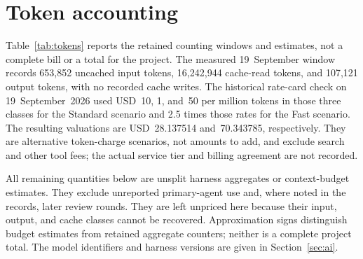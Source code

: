 \documentclass[11pt]{amsart}
\theoremstyle{plain}
\theoremstyle{definition}
\theoremstyle{remark}
\numberwithin{equation}{section}
\begin{document}
\appendix
\section{Token accounting}\label{app:tokens}

Table~\ref{tab:tokens} reports the retained counting windows and
estimates, not a complete bill or a total for the project. The measured
19~September window records 653,852 uncached input tokens, 16,242,944
cache-read tokens, and 107,121 output tokens, with no recorded cache
writes. The historical rate-card check on 19~September~2026 used
USD~10, 1, and~50 per million tokens in those three classes for the
Standard scenario and 2.5 times those rates for the Fast scenario.
The resulting valuations are USD~28.137514 and~70.343785, respectively.
They are alternative token-charge scenarios, not amounts to add, and
exclude search and other tool fees; the actual service tier and billing
agreement are not recorded.

All remaining quantities below are unsplit harness aggregates or
context-budget estimates. They exclude unreported primary-agent use
and, where noted in the records, later review rounds. They are left
unpriced here because their input, output, and cache classes cannot be
recovered. Approximation signs distinguish budget estimates from
retained aggregate counters; neither is a complete project total.
The model identifiers and harness versions are given in
Section~\ref{sec:ai}.
\end{document}
